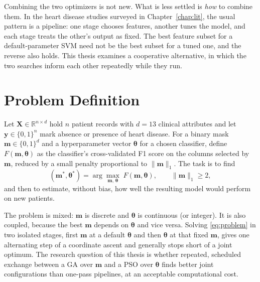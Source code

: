 \documentclass[MTech]{ugthesis}
\begin{document}
Combining the two optimizers is not new. What is less settled is \emph{how} to combine them. In the heart disease studies surveyed in Chapter~\ref{chap:lit}, the usual pattern is a pipeline: one stage chooses features, another tunes the model, and each stage treats the other's output as fixed. The best feature subset for a default-parameter SVM need not be the best subset for a tuned one, and the reverse also holds. This thesis examines a cooperative alternative, in which the two searches inform each other repeatedly while they run.

\section{Problem Definition}
\label{sec:problem}
Let $\mathbf{X}\in\mathbb{R}^{n\times d}$ hold $n$ patient records with $d=13$ clinical attributes and let $\mathbf{y}\in\{0,1\}^n$ mark absence or presence of heart disease. For a binary mask $\mathbf{m}\in\{0,1\}^d$ and a hyperparameter vector $\boldsymbol{\theta}$ for a chosen classifier, define $F(\mathbf{m},\boldsymbol{\theta})$ as the classifier's cross-validated F1 score on the columns selected by $\mathbf{m}$, reduced by a small penalty proportional to $\|\mathbf{m}\|_1$. The task is to find
\begin{equation}
(\mathbf{m}^{*},\boldsymbol{\theta}^{*}) = \arg\max_{\mathbf{m},\,\boldsymbol{\theta}} \; F(\mathbf{m},\boldsymbol{\theta}),
\qquad \|\mathbf{m}\|_1 \ge 2,
\label{eq:problem}
\end{equation}
and then to estimate, without bias, how well the resulting model would perform on new patients.

The problem is mixed: $\mathbf{m}$ is discrete and $\boldsymbol{\theta}$ is continuous (or integer). It is also coupled, because the best $\mathbf{m}$ depends on $\boldsymbol{\theta}$ and vice versa. Solving \eqref{eq:problem} in two isolated stages, first $\mathbf{m}$ at a default $\boldsymbol{\theta}$ and then $\boldsymbol{\theta}$ at that fixed $\mathbf{m}$, gives one alternating step of a coordinate ascent and generally stops short of a joint optimum. The research question of this thesis is whether repeated, scheduled exchange between a GA over $\mathbf{m}$ and a PSO over $\boldsymbol{\theta}$ finds better joint configurations than one-pass pipelines, at an acceptable computational cost.
\end{document}
